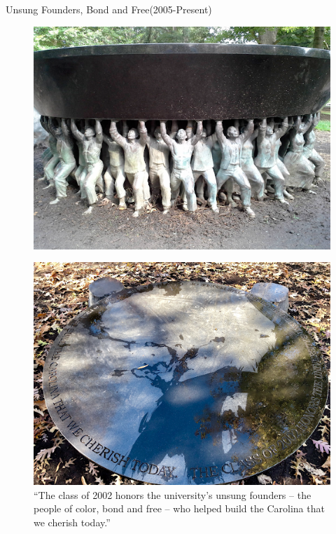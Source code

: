 \documentclass[10pt]{beamer}
\begin{document}
\begin{frame}{Unsung Founders, Bond and Free(2005-Present)}
    \begin{minipage}{0.5\textwidth}
    \begin{figure}
        \includegraphics[scale = 0.3]{photos/photo2.png}
    \end{figure}
    \end{minipage}
    \begin{minipage}{0.4\textwidth}
   
    \begin{figure}
        \includegraphics[scale = 0.3]{photos/photo3.png}
        \caption{ “The class of 2002 honors the university’s unsung founders – the people of color, bond and free – who helped build the Carolina that we cherish today.”}
    \end{figure}
     \vspace{-2.4cm}
    \end{minipage}
\end{frame}
\end{document}
